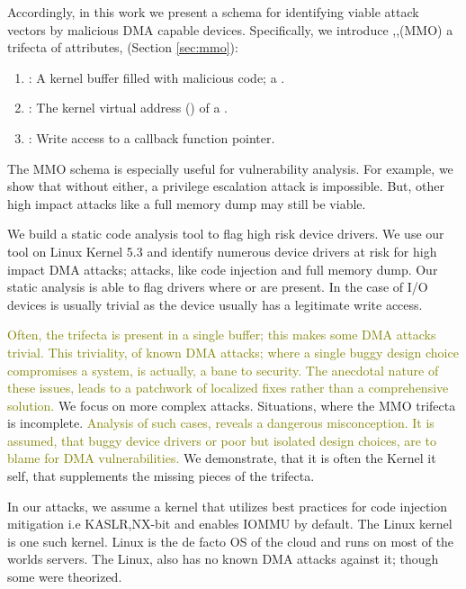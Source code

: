 
Accordingly, in this work we present a schema for identifying viable attack vectors by malicious DMA capable devices. Specifically, we introduce \means,\motivation,\oportunity (MMO) a trifecta of attributes, (Section \ref{sec:mmo}):
\begin{enumerate}
    \item \motivation: A kernel buffer filled with malicious code; a \mabaf.
    \item \means: The kernel virtual address (\kva) of a \mabaf.
    \item \oportunity: Write access to a callback function pointer.
\end{enumerate} 

The MMO schema is especially useful for vulnerability analysis. For example, we show that without either, a privilege escalation attack is impossible. But, other high impact attacks like a full memory dump may still be viable.  

We build a static code analysis tool to flag high risk device drivers. We use our tool on Linux Kernel 5.3 and identify numerous device drivers at risk for high impact DMA attacks; attacks, like code injection and full memory dump. Our static analysis is able to flag drivers where \means{} or \oportunity{} are present. In the case of I/O devices \motivation{} is usually trivial as the device usually has a legitimate write access. 


\textcolor{olive}{Often, the trifecta is present in a single buffer; this makes some DMA attacks trivial\cite{thunder}. This triviality, of known DMA attacks; where a single buggy design choice compromises a system, is actually, a bane to security. The anecdotal nature of these issues, leads to a patchwork of localized fixes rather than a comprehensive solution.} We focus on more complex attacks. Situations, where the MMO trifecta is incomplete. \textcolor{olive}{Analysis of such cases, reveals a dangerous misconception. It is assumed, that buggy device drivers or poor but isolated design choices, are to blame for DMA vulnerabilities.} We demonstrate, that it is often the Kernel it self, that supplements the missing pieces of the trifecta. 

In our attacks, we assume a kernel that utilizes best practices for code injection mitigation i.e KASLR,NX-bit and enables IOMMU by default. The Linux kernel is one such kernel. Linux is the de facto OS of the cloud and runs on most of the worlds servers. The Linux, also has no known DMA attacks against it; though some were theorized\cite{MMT16,thunder}.


